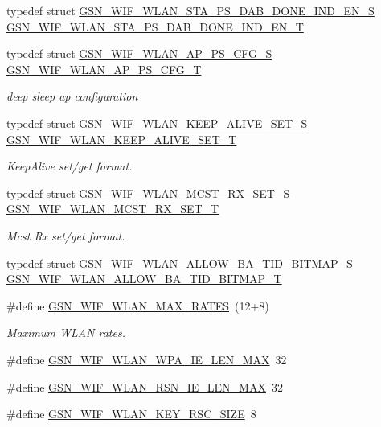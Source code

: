 \begin{DoxyCompactItemize}
\item 
typedef struct \hyperlink{a00404}{GSN\_\-WIF\_\-WLAN\_\-STA\_\-PS\_\-DAB\_\-DONE\_\-IND\_\-EN\_\-S} \hyperlink{a00677_ga1cf71e203d0c95dd43cfcdfea736733c}{GSN\_\-WIF\_\-WLAN\_\-STA\_\-PS\_\-DAB\_\-DONE\_\-IND\_\-EN\_\-T}
\item 
typedef struct \hyperlink{a00368}{GSN\_\-WIF\_\-WLAN\_\-AP\_\-PS\_\-CFG\_\-S} \hyperlink{a00677_ga5b778f6fbad2d264cc6e8d03a61b7a42}{GSN\_\-WIF\_\-WLAN\_\-AP\_\-PS\_\-CFG\_\-T}
\begin{DoxyCompactList}\small\item\em deep sleep ap configuration \end{DoxyCompactList}\item 
typedef struct \hyperlink{a00385}{GSN\_\-WIF\_\-WLAN\_\-KEEP\_\-ALIVE\_\-SET\_\-S} \hyperlink{a00677_ga05b94921534c912004364babe9d0c9e9}{GSN\_\-WIF\_\-WLAN\_\-KEEP\_\-ALIVE\_\-SET\_\-T}
\begin{DoxyCompactList}\small\item\em KeepAlive set/get format. \end{DoxyCompactList}\item 
typedef struct \hyperlink{a00389}{GSN\_\-WIF\_\-WLAN\_\-MCST\_\-RX\_\-SET\_\-S} \hyperlink{a00677_ga1c35c53aa2b78b1856a8fe1233b8368e}{GSN\_\-WIF\_\-WLAN\_\-MCST\_\-RX\_\-SET\_\-T}
\begin{DoxyCompactList}\small\item\em Mcst Rx set/get format. \end{DoxyCompactList}\item 
typedef struct \hyperlink{a00365}{GSN\_\-WIF\_\-WLAN\_\-ALLOW\_\-BA\_\-TID\_\-BITMAP\_\-S} \hyperlink{a00677_gafb05388636305e014ec95505951eca42}{GSN\_\-WIF\_\-WLAN\_\-ALLOW\_\-BA\_\-TID\_\-BITMAP\_\-T}
\item 
\#define \hyperlink{a00677_ga1bec540337ad0475486c1dcc1dd60aa2}{GSN\_\-WIF\_\-WLAN\_\-MAX\_\-RATES}~(12+8)
\begin{DoxyCompactList}\small\item\em Maximum WLAN rates. \end{DoxyCompactList}\item 
\#define \hyperlink{a00677_gac384187529d8e8d49764778d35cb15c6}{GSN\_\-WIF\_\-WLAN\_\-WPA\_\-IE\_\-LEN\_\-MAX}~32
\item 
\#define \hyperlink{a00677_ga275d137a8bc7f90a904a86cd30f7be8c}{GSN\_\-WIF\_\-WLAN\_\-RSN\_\-IE\_\-LEN\_\-MAX}~32
\item 
\#define \hyperlink{a00677_ga0677cf76723bfaf90a5756b1cee19702}{GSN\_\-WIF\_\-WLAN\_\-KEY\_\-RSC\_\-SIZE}~8

\end{DoxyCompactItemize}
